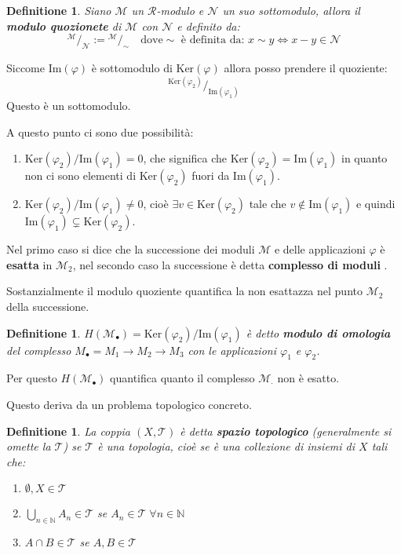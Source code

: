 \documentclass{article}
\newtheorem{definition}[theorem]{Definitione}
\newcommand{\R}{\mathcal{R}}
\newcommand{\M}{\mathcal{M}}
\newcommand{\N}{\mathcal{N}}
\newcommand{\im}{\mathrm{Im}}
\renewcommand{\ker}{\mathrm{Ker}}
\renewcommand{\phi}{\varphi}
\newcommand*\quot[2]{{^{\textstyle #1}\big/_{\textstyle #2}}}
\begin{document}
\begin{definition}
  Siano $ \M $ un $ \R $-modulo e $ \N $ un suo sottomodulo, allora il \textbf{modulo
  quozionete}  di $ \M $ con $ \N $ e definito da:
  \[
    \quot{\M}{\N} := \quot{\M}{\sim} \quad \text{dove} \sim \text{ è definita da: } x \sim y \Leftrightarrow x - y \in \N
  \]
\end{definition}

Siccome $ \im (\phi) $ è sottomodulo di $ \ker (\phi) $ allora posso prendere
il quoziente:
\[
  \quot{\ker (\phi_2)}{\im (\phi_1)}
\]
Questo è un sottomodulo.

A questo punto ci sono due possibilità:
\begin{enumerate}
\item $ {\ker (\phi_2)} \slash {\im (\phi_1)} = 0 $, che significa che $ \ker (\phi_2) = \im (\phi_1) $ in quanto non ci sono elementi di $ \ker (\phi_2) $ fuori da $ \im (\phi_1) $.
\item $ {\ker (\phi_2)} \slash {\im (\phi_1)} \not= 0 $, cioè $ \exists v \in \ker (\phi_2) $
  tale che $ v \not \in \im (\phi_1) $ e quindi $ \im (\phi_1) \subsetneq \ker (\phi_2) $.
\end{enumerate}
Nel primo caso si dice che la successione dei moduli $ \M $ e delle
applicazioni $ \phi $ è \textbf{esatta}  in $ \M_2$, nel secondo caso la
successione è detta \textbf{complesso di moduli} .

Sostanzialmente il modulo quoziente quantifica la non esattazza nel punto $ \M_2 $
della successione.

\begin{definition}
  $ H(\M_\bullet) = {\ker (\phi_2)} \slash {\im (\phi_1)} $ è detto \textbf{modulo di omologia} 
  del complesso $ M_\bullet = M_1 \longrightarrow M_2 \longrightarrow M_3 $ con le applicazioni $ \phi_1 $ e $ \phi_2 $.
\end{definition}
Per questo  $ H(\M_\bullet) $ quantifica quanto il complesso $ \M_\cdot $ non è esatto.

Questo deriva da un problema topologico concreto.

\begin{definition}
  La coppia $ (X, \mathcal{T}) $ è detta \textbf{spazio topologico}  (generalmente si omette la $ \mathcal{T} $)
  se $ \mathcal{T} $ è una topologia, cioè se è una collezione di insiemi di $ X $ tali che:
  \begin{enumerate}
  \item $ \emptyset, X \in \mathcal{T} $
  \item $ \bigcup_{n \in \mathbb{N}} A_n \in \mathcal{T} $ se $ A_n \in \mathcal{T} \; \forall n \in \mathbb{N} $
  \item $ A \cap B \in \mathcal{T} $ se $ A,B \in \mathcal{T} $
  \end{enumerate}
\end{definition}
\end{document}
